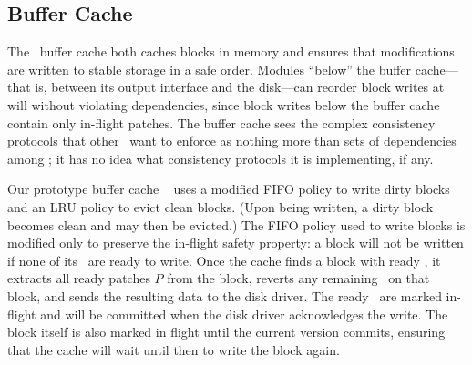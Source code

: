 
\subsection{Buffer Cache}
\label{sec:modules:wbcache}

The \Kudos\ buffer cache both
%
caches blocks in memory and
ensures that modifications are written to stable storage in a safe order.
%
Modules ``below'' the buffer cache---that is, between its output interface
and the disk---can reorder block writes at will without violating
dependencies, since block writes below the buffer cache contain only
in-flight patches.
%
%
The buffer cache sees the complex
consistency protocols that other \modules\ want to enforce as nothing more
than sets of dependencies among \patches; it has no idea what consistency
protocols it is implementing, if any.

Our prototype buffer cache \module\ 
%
uses a modified FIFO policy to write dirty blocks and an LRU policy to
evict clean blocks.  (Upon being written, a dirty block becomes clean and
may then be evicted.)
%
The FIFO policy used to write blocks is modified only to preserve the
in-flight safety property: a block will not be written if none of its
\patches\ are ready to write.
%
Once the cache finds a block with ready \patches, it extracts all ready
patches $P$ from the block, reverts any remaining \patches\ on that block,
and sends the resulting data to the disk driver.  The ready \patches\ are
marked in-flight and will be committed when the disk driver acknowledges
the write.
%
The block itself is also marked in flight until the current version
commits, ensuring that the cache will wait until then to write the block
again.


